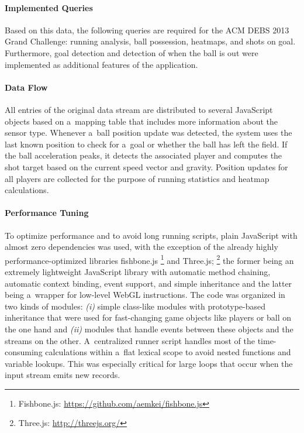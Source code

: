 \documentclass{sig-alternate}
\newcommand{\inlinelistingsize}{\fontsize{8pt}{11pt}}
\let\oldurl\url
\renewcommand{\url}[1]{\inlinelistingsize\oldurl{#1}}
\begin{document}
\paragraph{Implemented Queries}

Based on this data, the following queries are required
for the ACM DEBS 2013 Grand Challenge:
running analysis, ball possession, heatmaps, and shots on goal.
Furthermore, goal detection and detection of when the ball is out were implemented as additional features of the application.

\paragraph{Data Flow}

All entries of the original data stream are distributed
to several JavaScript objects based on a~mapping table
that includes more information about the sensor type.
Whenever a~ball position update was detected,
the system uses the last known position to check
for a~goal or whether the ball has left the field.
If the ball acceleration peaks, it detects the associated player
and computes the shot target
based on the current speed vector and gravity.
Position updates for all players are collected
for the purpose of running statistics and heatmap calculations.

\paragraph{Performance Tuning}

To optimize performance
and to avoid long running scripts,
plain JavaScript with almost zero dependencies was used,
with the exception of the already highly performance-optimized libraries fishbone.js%
\footnote{Fishbone.js: \url{https://github.com/aemkei/fishbone.js}}
and Three.js;%
\footnote{Three.js: \url{http://threejs.org/}}
the former being an extremely lightweight JavaScript library with automatic method chaining, automatic context binding, event support, and simple inheritance and the latter being a~wrapper for low-level WebGL instructions.
The code was organized in two kinds of modules:
\emph{(i)} simple class-like modules with prototype-based inheritance
that were used for fast-changing game objects
like players or ball on the one hand
and \emph{(ii)} modules that handle events between these objects
and the streams on the other.
A~centralized runner script handles
most of the time-consuming calculations within a~flat lexical scope
to avoid nested functions and variable lookups.
This was especially critical for large loops
that occur when the input stream emits new records.
\end{document}
